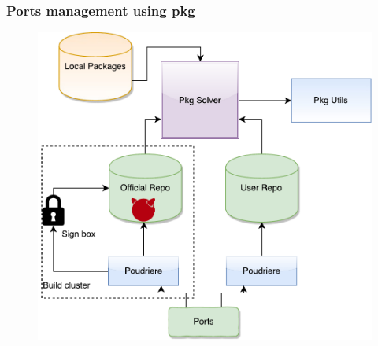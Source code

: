 \documentclass{beamer}
\begin{document}
\begin{frame}[fragile]
\frametitle{Ports management using pkg}
\begin{figure}[h!]
  \centering
  \includegraphics[height=0.7\textheight]{pkg_ports.pdf}
\end{figure}
\end{frame}



\end{document}
